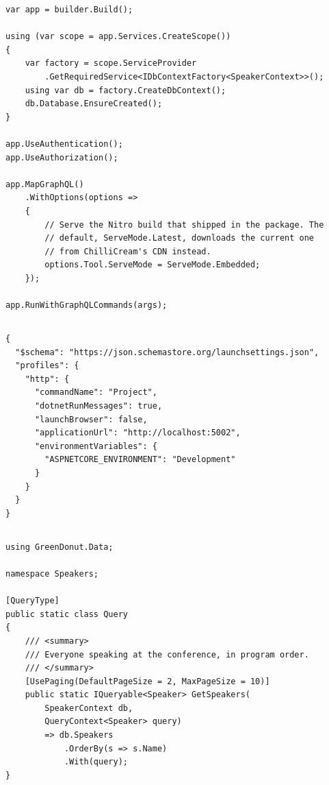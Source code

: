 \begin{verbatim}
var app = builder.Build();

using (var scope = app.Services.CreateScope())
{
    var factory = scope.ServiceProvider
        .GetRequiredService<IDbContextFactory<SpeakerContext>>();
    using var db = factory.CreateDbContext();
    db.Database.EnsureCreated();
}

app.UseAuthentication();
app.UseAuthorization();

app.MapGraphQL()
    .WithOptions(options =>
    {
        // Serve the Nitro build that shipped in the package. The
        // default, ServeMode.Latest, downloads the current one
        // from ChilliCream's CDN instead.
        options.Tool.ServeMode = ServeMode.Embedded;
    });

app.RunWithGraphQLCommands(args);
\end{verbatim}

\subsection*{}
\begin{verbatim}
{
  "$schema": "https://json.schemastore.org/launchsettings.json",
  "profiles": {
    "http": {
      "commandName": "Project",
      "dotnetRunMessages": true,
      "launchBrowser": false,
      "applicationUrl": "http://localhost:5002",
      "environmentVariables": {
        "ASPNETCORE_ENVIRONMENT": "Development"
      }
    }
  }
}
\end{verbatim}

\subsection*{}
\begin{verbatim}
using GreenDonut.Data;

namespace Speakers;

[QueryType]
public static class Query
{
    /// <summary>
    /// Everyone speaking at the conference, in program order.
    /// </summary>
    [UsePaging(DefaultPageSize = 2, MaxPageSize = 10)]
    public static IQueryable<Speaker> GetSpeakers(
        SpeakerContext db,
        QueryContext<Speaker> query)
        => db.Speakers
            .OrderBy(s => s.Name)
            .With(query);
}
\end{verbatim}

